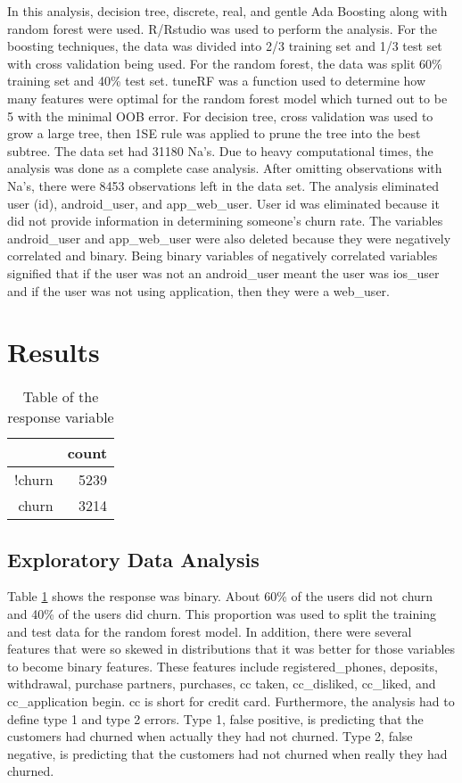 \documentclass{article}\usepackage[]{graphicx}\usepackage[]{color}
\begin{document}
\qquad In this analysis, decision tree, discrete, real, and gentle Ada Boosting along with random forest were used. R/Rstudio was used to perform the analysis. For the boosting techniques, the data was divided into 2/3 training set and 1/3 test set with cross validation being used. For the random forest, the data was split 60\% training set and 40\% test set. tuneRF was a function used to determine how many features were optimal for the random forest model which turned out to be 5 with the minimal OOB error. For decision tree, cross validation was used to grow a large tree, then 1SE rule was applied to prune the tree into the best subtree. The data set had 31180 Na's. Due to heavy computational times, the analysis was done as a complete case analysis. After omitting observations with Na's, there were 8453 observations left in the data set. The analysis eliminated user (id), android_user, and app_web_user. User id was eliminated because it did not provide information in determining someone's churn rate. The variables android_user and app_web_user were also deleted because they were negatively correlated and binary. Being binary variables of negatively correlated variables signified that if the user was not an android_user meant the user was ios_user and if the user was not using application, then they were a web_user. 
\section{Results}
\begin{center}

\begin{table}[ht]
\centering
\caption{Table of the response variable}
\label{response}
\begin{tabular}{rr}
  \hline
 & count \\ 
  \hline 
!churn & 5239 \\ 
  churn & 3214 \\ 
   \hline
\end{tabular}
\end{table}
\end{center}

\subsection{Exploratory Data Analysis}

\qquad Table \ref{response} shows the response was binary. About 60\% of the users did not churn and 40\% of the users did churn. This proportion was used to split the training and test data for the random forest model. In addition, there were several features that were so skewed in distributions that it was better for those variables to become binary features. These features include registered_phones, deposits, withdrawal, purchase partners, purchases, cc taken, cc_disliked, cc_liked, and cc_application begin. cc is short for credit card. Furthermore, the analysis had to define type 1 and type 2 errors. Type 1, false positive, is predicting that the customers had churned when actually they had not churned. Type 2, false negative, is predicting that the customers had not churned when really they had churned. 
\end{document}
